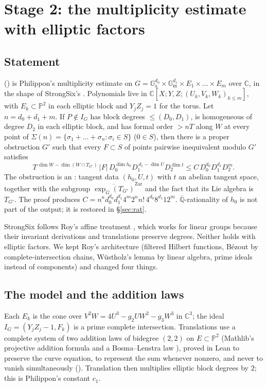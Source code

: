 \documentclass[11pt]{amsart}
\theoremstyle{definition}
\theoremstyle{remark}
\numberwithin{equation}{section}
\newcommand{\CC}{\mathbb{C}}
\newcommand{\PP}{\mathbb{P}}
\newcommand{\Qbar}{\overline{\mathbb{Q}}}
\newcommand{\Ga}{\mathbb{G}_{\mathrm{a}}}
\newcommand{\Gm}{\mathbb{G}_{\mathrm{m}}}
\begin{document}
\section{Stage 2: the multiplicity estimate with elliptic factors}\label{sec:stage2}

\subsection{Statement}
 () is Philippon's multiplicity estimate
\cite[Thm.~2.1]{Philippon1986} on $G=\Ga^{d_0}\times\Gm^{d_1}\times E_1\times\dots\times E_m$ over $\CC$, in
the shape of StrongSix's . Polynomials live in $\CC[X;Y,Z;(U_k,V_k,W_k)_{k\le m}]$, with
$E_k\subset\PP^2$ in each elliptic block and $Y_jZ_j=1$ for the torus. Let $n=d_0+d_1+m$. If
$P\notin I_G$ has block degrees $\le(D_0,D_1)$, is homogeneous of degree $D_2$ in each elliptic block,
and has formal order $>nT$ along $W$ at every point of $\Sigma(n)=\{\sigma_1+\dots+\sigma_n:\sigma_i\in S\}$
($0\in S$), then there is a proper obstruction $G'$ such that every $F\subset S$ of points pairwise
inequivalent modulo $G'$ satisfies
\[
T^{\,\dim W-\dim(W\cap T_{G'})}\,|F|\,D_0^{\dim h_0}D_1^{\,d_1-\dim U}D_2^{\dim t}\le C\,D_0^{d_0}D_1^{d_1}D_2^{m}.
\]
The obstruction is an : tangent data $(h_0,U,t)$ with $t$ an abelian tangent space,
together with the subgroup $\overline{\exp_G(T_{G'})}^{\mathrm{Zar}}$ and the fact that its Lie algebra is
$T_{G'}$. The proof  produces $C=n^nd_0^{d_0}d_1^{d_1}4^m2^nn!\,4^{d_0}8^{d_1}12^m$.
$\Qbar$-rationality of $h_0$ is not part of the output; it is restored in \S\ref{sec:rat}.

StrongSix follows Roy's affine treatment \cite[Ch.~5, 8]{DALAG}, which works for linear groups because
their invariant derivations and translations preserve degrees. Neither holds with elliptic factors.
We kept Roy's architecture (filtered Hilbert functions, Bézout by complete-intersection chains,
Wüstholz's lemma by linear algebra, prime ideals instead of components) and changed four things.

\subsection{The model and the addition laws}
Each $E_k$ is the cone over $V^2W=4U^3-g_2UW^2-g_3W^3$ in $\CC^3$; the ideal $I_G=(Y_jZ_j-1,F_k)$ is a
prime complete intersection. Translations use a complete system of two addition laws of bidegree
$(2,2)$ on $E\subset\PP^2$ (Mathlib's projective addition formula and a Bosma--Lenstra law
\cite{BosmaLenstra1995}), proved in Lean to preserve the curve equation, to represent the sum whenever
nonzero, and never to vanish simultaneously (). Translation then
multiplies elliptic block degrees by $2$; this is Philippon's constant $c_1$.
\end{document}
